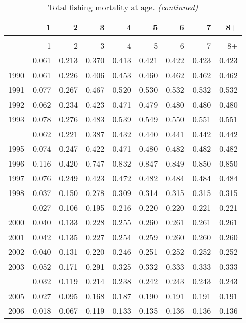 \documentclass[
]{article}
\begin{document}
\begin{longtable}[t]{lrrrrrrrr}
\caption{\label{tab:FAA-tot-table}Total fishing mortality at age.}\\
\toprule
  & 1 & 2 & 3 & 4 & 5 & 6 & 7 & 8+\\
\midrule
\endfirsthead
\caption[]{Total fishing mortality at age. \textit{(continued)}}\\
\toprule
  & 1 & 2 & 3 & 4 & 5 & 6 & 7 & 8+\\
\midrule
\endhead

\endfoot
\bottomrule
\endlastfoot
1989 & 0.061 & 0.213 & 0.370 & 0.413 & 0.421 & 0.422 & 0.423 & 0.423\\
1990 & 0.061 & 0.226 & 0.406 & 0.453 & 0.460 & 0.462 & 0.462 & 0.462\\
1991 & 0.077 & 0.267 & 0.467 & 0.520 & 0.530 & 0.532 & 0.532 & 0.532\\
1992 & 0.062 & 0.234 & 0.423 & 0.471 & 0.479 & 0.480 & 0.480 & 0.480\\
1993 & 0.078 & 0.276 & 0.483 & 0.539 & 0.549 & 0.550 & 0.551 & 0.551\\
\addlinespace
1994 & 0.062 & 0.221 & 0.387 & 0.432 & 0.440 & 0.441 & 0.442 & 0.442\\
1995 & 0.074 & 0.247 & 0.422 & 0.471 & 0.480 & 0.482 & 0.482 & 0.482\\
1996 & 0.116 & 0.420 & 0.747 & 0.832 & 0.847 & 0.849 & 0.850 & 0.850\\
1997 & 0.076 & 0.249 & 0.423 & 0.472 & 0.482 & 0.484 & 0.484 & 0.484\\
1998 & 0.037 & 0.150 & 0.278 & 0.309 & 0.314 & 0.315 & 0.315 & 0.315\\
\addlinespace
1999 & 0.027 & 0.106 & 0.195 & 0.216 & 0.220 & 0.220 & 0.221 & 0.221\\
2000 & 0.040 & 0.133 & 0.228 & 0.255 & 0.260 & 0.261 & 0.261 & 0.261\\
2001 & 0.042 & 0.135 & 0.227 & 0.254 & 0.259 & 0.260 & 0.260 & 0.260\\
2002 & 0.040 & 0.131 & 0.220 & 0.246 & 0.251 & 0.252 & 0.252 & 0.252\\
2003 & 0.052 & 0.171 & 0.291 & 0.325 & 0.332 & 0.333 & 0.333 & 0.333\\
\addlinespace
2004 & 0.032 & 0.119 & 0.214 & 0.238 & 0.242 & 0.243 & 0.243 & 0.243\\
2005 & 0.027 & 0.095 & 0.168 & 0.187 & 0.190 & 0.191 & 0.191 & 0.191\\
2006 & 0.018 & 0.067 & 0.119 & 0.133 & 0.135 & 0.136 & 0.136 & 0.136\\

\end{longtable}
\end{document}

